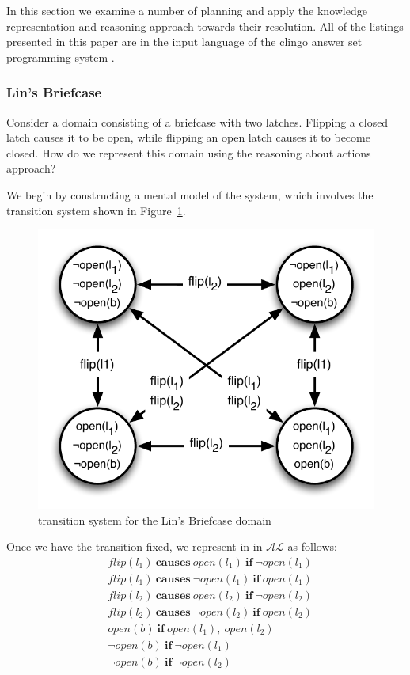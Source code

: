 \documentclass{article}
\newcommand{\AL}{\ensuremath{\mathcal{AL}}}
\newcommand{\dynamiclawp}[3]{\ensuremath{#1 \: \mathbf{causes} \: #2 \: \mathbf{if} \: #3}}
\newcommand{\staticlaw}[2]{\ensuremath{#1 \: \mathbf{if} \: #2}}
\begin{document}
In this section we examine a number of planning and apply the knowledge representation and reasoning approach towards their resolution. All of the listings presented in this paper are in the input language of the clingo answer set programming system \cite{clingo}.

\subsubsection{Lin's Briefcase}

Consider a domain consisting of a briefcase with two latches. Flipping a closed latch causes it to be open, while flipping an open latch causes it to become closed. How do we represent this domain using the reasoning about actions approach?

We begin by constructing a mental model of the system, which involves the transition system shown in Figure~\ref{lin-tran}.

\begin{figure}[htb]
    \centering
    \includegraphics[scale=0.50]{briefcase}
    \caption{transition system for the Lin's Briefcase domain}
    \label{lin-tran}
\end{figure}

Once we have the transition fixed, we represent in in $\AL$ as follows:
\begin{align*}
    &\dynamiclawp{flip(l_{1})}{open(l_{1})}{\neg{open(l_{1})}} \\
    &\dynamiclawp{flip(l_{1})}{\neg{open(l_{1})}}{open(l_{1})} \\
    &\dynamiclawp{flip(l_{2})}{open(l_{2})}{\neg{open(l_{2})}} \\
    &\dynamiclawp{flip(l_{2})}{\neg{open(l_{2})}}{open(l_{2})} \\
    &\staticlaw{open(b)}{open(l_{1}),\:open(l_{2})} \\
    &\staticlaw{\neg{open(b)}}{\neg{open(l_{1})}} \\
    &\staticlaw{\neg{open(b)}}{\neg{open(l_{2})}}
\end{align*}
\end{document}

